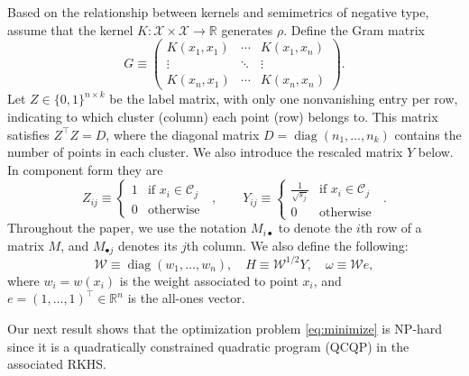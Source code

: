 \documentclass[10pt,journal,compsoc]{IEEEtran}
\DeclareMathOperator{\diag}{diag}
\newcommand\kk{K}
\newcommand\C{{\mathcal{C}}}
\newcommand\Zt{Y}
\newcommand\e{e}
\newcommand\om{\omega}
\begin{document}
Based on the relationship between kernels and semimetrics of negative
type, 
assume that the kernel $\kk: \mathcal{X} \times \mathcal{X} \to \mathbb{R}$ 
generates $\rho$.  Define  the Gram matrix
\begin{equation}
\label{eq:kernel_matrix}
G \equiv \begin{pmatrix}
\kk(x_1,x_1)     & \dotsm     & \kk(x_1,x_n) \\
\vdots           & \ddots     & \vdots \\
\kk(x_n,x_1)     & \dotsm     & \kk(x_n,x_n) 
\end{pmatrix} .
\end{equation}
Let $Z \in \{ 0,1 \}^{n\times k}$ be the label matrix, 
with only one nonvanishing entry per row, 
indicating to which cluster (column)
each point (row) belongs to. This matrix satisfies
$Z^\top Z = D$, where the diagonal matrix 
$D = \diag( n_1,\dotsc, n_k )$  contains
the number of points in each cluster. We also introduce the rescaled
matrix  $Y$ below. In component form they are 
\begin{equation}
\label{eq:label_matrix}
Z_{ij} \equiv \begin{cases}
1 & \mbox{if $x_i \in \C_j$ } \\
0 & \mbox{otherwise}
\end{cases}, \qquad
\Zt_{ij} \equiv \begin{cases}
\tfrac{1}{\sqrt{s_j}} & \mbox{if $x_i \in \C_j$ } \\
0 & \mbox{otherwise}
\end{cases} .
\end{equation}
Throughout the paper, we use the notation $M_{i\bullet}$ to denote
the $i$th row of a matrix $M$, and $M_{\bullet j}$ denotes its $j$th column.
We also define the following:
\begin{equation}
\label{eq:weighted_matrices}
\mathcal{W} \equiv \diag(w_1,\dotsc,w_n), \quad
H \equiv \mathcal{W}^{1/2} Y, \quad
\om \equiv \mathcal{W} \e,
\end{equation}
where $w_i = w(x_i)$ is the weight associated to point $x_i$, 
and $\e =(1,\dotsc,1)^\top \in \mathbb{R}^n$ 
is the all-ones vector. 

Our next result shows that the optimization problem \eqref{eq:minimize}
is NP-hard since it is a quadratically constrained quadratic program 
(QCQP) in the associated RKHS.
\end{document}
